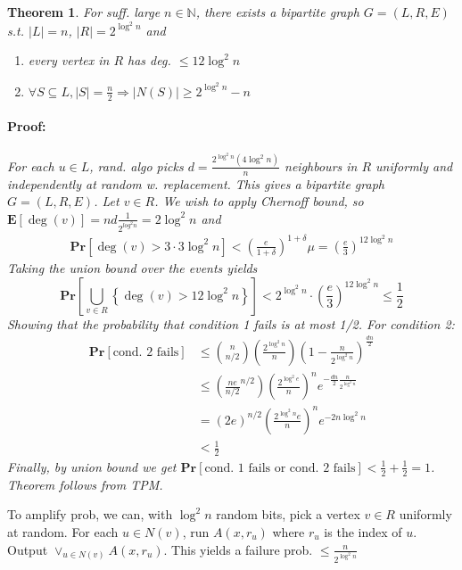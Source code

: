 \documentclass[12pt]{article}
\newtheorem{thm}{Theorem}[section]
\begin{document}
\begin{thm}
For suff. large $n \in \mathbb{N}$, there exists a bipartite graph $G=(L,R,E)$ s.t. $|L| = n$, $|R| = 2^{\log^2 n}$ and
\begin{enumerate}
\item every vertex in $R$ has deg. $\leq 12 \log^2 n$
\item $\forall S \subseteq L, |S|=\frac{n}{2} \Rightarrow |N(S)| \geq 2^{\log^2 n} - n$
\end{enumerate}
\paragraph{Proof: } For each $u \in L$, rand. algo picks $d=\frac{2^{\log^2 n}(4 \log^2 n)}{n}$ neighbours in $R$ uniformly and independently at random w. replacement. This gives a bipartite graph $G=(L,R,E)$. Let $v \in R$. We wish to apply Chernoff bound, so $\mathbf{E}[\deg(v)]=nd\frac{1}{2^{log^2 n}} = 2 \log^2 n$ and
\begin{align*}
\mathbf{Pr}\left[ \deg(v) > 3 \cdot 3 \log^2 n \right] < \left( \frac{e}{1+\delta}\right)^{1+\delta}\mu=\left( \frac{e}{3} \right)^{12\log^2 n}
\end{align*}
Taking the union bound over the events yields $$\mathbf{Pr}\left[ \bigcup_{v \in R} \left\{ \deg(v) > 12 \log^2 n \right\} \right] < 2^{\log^2 n} \cdot \left(\frac{e}{3} \right)^{12 \log^2 n} \leq \frac{1}{2}$$
Showing that the probability that condition 1 fails is at most 1/2. For condition 2:
\begin{align*}
\mathbf{Pr}[\text{cond. 2 fails}] &\leq \binom{n}{n/2}\left( \frac{2^{\log^2 n}}{n} \right)\left( 1- \frac{n}{2^{\log^2 n}} \right)^{\frac{dn}{2}} \\
&\leq \left( \frac{ne}{n/2}^{n/2} \right) \left( \frac{2^{\log^2 e}}{n} \right)^n e^{-\frac{dn}{2}\frac{n}{2^{\log^2 n}}} \\
&= (2e)^{n/2}\left( \frac{2^{\log^2 n}e}{n} \right)^n e^{-2n \log^2 n} \\
&< \frac{1}{2}
\end{align*}
Finally, by union bound we get $\mathbf{Pr}[\text{cond. 1 fails or cond. 2 fails}] < \frac{1}{2} + \frac{1}{2} = 1$. Theorem follows from TPM.

\end{thm}
To amplify prob, we can, with $\log^2 n$ random bits, pick a vertex $v \in R$ uniformly at random. For each $u \in N(v)$, run $A(x,r_u)$ where $r_u$ is the index of $u$. Output $\lor_{u \in N(v)} A(x,r_u)$. This yields a failure prob. $\leq \frac{n}{2^{\log^2 n}}$
\end{document}
